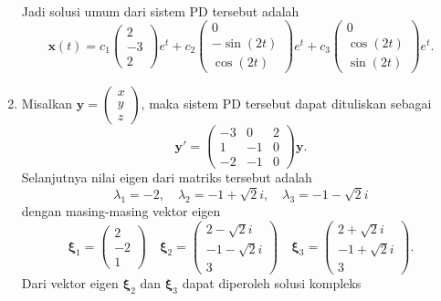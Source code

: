 \documentclass[a4paper]{article}
\theoremstyle{definisi}
\newcommand{\bfxi}{\boldsymbol{\xi}}
\numberwithin{equation}{section}
\begin{document}
\begin{enumerate}
\begin{align*}
    \end{align*}
    Jadi solusi umum dari sistem PD tersebut adalah
    \[\mathbf{x}(t) = c_1\begin{pmatrix}2\\-3\\2\end{pmatrix}e^t + c_2\begin{pmatrix}0\\-\sin(2t)\\ \cos(2t)\end{pmatrix}e^t + c_3\begin{pmatrix}0\\ \cos(2t)\\ \sin(2t)\end{pmatrix}e^t.\]
    
    \item Misalkan $\mathbf{y} = \begin{pmatrix}x\\y\\z\end{pmatrix}$, maka sistem PD tersebut dapat dituliskan sebagai
    \begin{equation*}
      \mathbf{y'}=\begin{pmatrix}
        -3 & 0 & 2\\
        1 & -1 & 0\\
        -2 & -1 & 0
      \end{pmatrix}\mathbf{y}.
    \end{equation*}
    Selanjutnya nilai eigen dari matriks tersebut adalah
    \[\lambda_1 = -2, \quad \lambda_2 = -1+\sqrt{2}i, \quad \lambda_3 = -1-\sqrt{2}i\]
    dengan masing-masing vektor eigen
    \[\bfxi_1 = \begin{pmatrix}2\\-2\\1\end{pmatrix} \quad \bfxi_2 = \begin{pmatrix}2-\sqrt{2}i\\-1-\sqrt{2}i\\3\end{pmatrix} \quad \bfxi_3 = \begin{pmatrix}2+\sqrt{2}i\\-1+\sqrt{2}i\\3\end{pmatrix}.\]
    Dari vektor eigen $\bfxi_2$ dan $\bfxi_3$ dapat diperoleh solusi kompleks
    \begin{align*}

\end{align*}
\end{enumerate}
\end{document}
